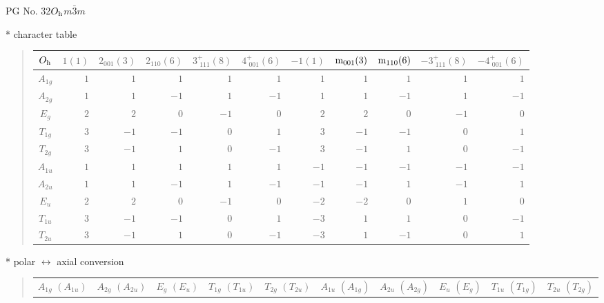 \documentclass[fleqn,8pt,landscape]{jsarticle}
\begin{document}
\setcounter{MaxMatrixCols}{32}

\renewcommand{\tablename}{Table~}
\renewcommand{\figurename}{Figure~}
\begin{center}
\LARGE
PG No. 32\quad$O_{\rm h}$\quad$m\bar{3}m$\quad[ cubic ]
\end{center}

* character table
\begin{quote}
\begin{tabular}{crrrrrrrrrr} \hline \hline
$ O_{\rm h} $ & $ 1(1) $ & $ 2{}_{001}(3) $ & $ 2{}_{110}(6) $ & $ 3^{+}_{\,\,111}(8) $ & $ 4^{+}_{\,\,001}(6) $ & $ -1(1) $ & $ {\rm m}_{001}(3) $ & $ {\rm m}_{110}(6) $ & $ -3^{+}_{\,\,111}(8) $ & $ -4^{+}_{\,\,001}(6) $ \\ \hline
$ A_{1g} $ & $ 1 $ & $ 1 $ & $ 1 $ & $ 1 $ & $ 1 $ & $ 1 $ & $ 1 $ & $ 1 $ & $ 1 $ & $ 1 $ \\
$ A_{2g} $ & $ 1 $ & $ 1 $ & $ -1 $ & $ 1 $ & $ -1 $ & $ 1 $ & $ 1 $ & $ -1 $ & $ 1 $ & $ -1 $ \\
$ E_{g} $ & $ 2 $ & $ 2 $ & $ 0 $ & $ -1 $ & $ 0 $ & $ 2 $ & $ 2 $ & $ 0 $ & $ -1 $ & $ 0 $ \\
$ T_{1g} $ & $ 3 $ & $ -1 $ & $ -1 $ & $ 0 $ & $ 1 $ & $ 3 $ & $ -1 $ & $ -1 $ & $ 0 $ & $ 1 $ \\
$ T_{2g} $ & $ 3 $ & $ -1 $ & $ 1 $ & $ 0 $ & $ -1 $ & $ 3 $ & $ -1 $ & $ 1 $ & $ 0 $ & $ -1 $ \\
$ A_{1u} $ & $ 1 $ & $ 1 $ & $ 1 $ & $ 1 $ & $ 1 $ & $ -1 $ & $ -1 $ & $ -1 $ & $ -1 $ & $ -1 $ \\
$ A_{2u} $ & $ 1 $ & $ 1 $ & $ -1 $ & $ 1 $ & $ -1 $ & $ -1 $ & $ -1 $ & $ 1 $ & $ -1 $ & $ 1 $ \\
$ E_{u} $ & $ 2 $ & $ 2 $ & $ 0 $ & $ -1 $ & $ 0 $ & $ -2 $ & $ -2 $ & $ 0 $ & $ 1 $ & $ 0 $ \\
$ T_{1u} $ & $ 3 $ & $ -1 $ & $ -1 $ & $ 0 $ & $ 1 $ & $ -3 $ & $ 1 $ & $ 1 $ & $ 0 $ & $ -1 $ \\
$ T_{2u} $ & $ 3 $ & $ -1 $ & $ 1 $ & $ 0 $ & $ -1 $ & $ -3 $ & $ 1 $ & $ -1 $ & $ 0 $ & $ 1 $ \\
 \hline \hline
\end{tabular}
\end{quote}

* polar $\leftrightarrow$ axial conversion
\begin{quote}
\begin{tabular}{cccccccccc}
$ A_{1g}\,\,(A_{1u}) $ & $ A_{2g}\,\,(A_{2u}) $ & $ E_{g}\,\,(E_{u}) $ & $ T_{1g}\,\,(T_{1u}) $ & $ T_{2g}\,\,(T_{2u}) $ & $ A_{1u}\,\,(A_{1g}) $ & $ A_{2u}\,\,(A_{2g}) $ & $ E_{u}\,\,(E_{g}) $ & $ T_{1u}\,\,(T_{1g}) $ & $ T_{2u}\,\,(T_{2g}) $
\end{tabular}
\end{quote}
\end{document}
